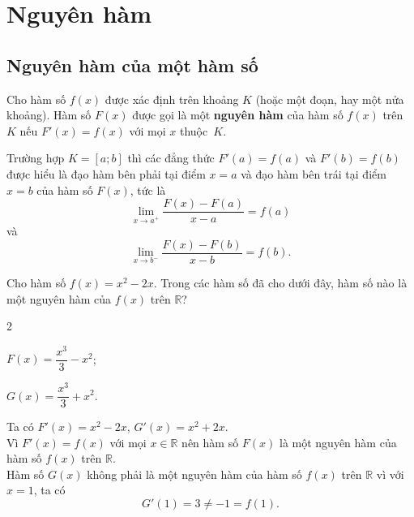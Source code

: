 \documentclass[12pt,aspectratio=169]{beamer}
\begin{document}

\section{Nguyên hàm}

\subsection{Nguyên hàm của một hàm số}

\begin{tomtat}
	\begin{dn}
		Cho hàm số $f(x)$ được xác định trên khoảng $K$ (hoặc một đoạn, hay một nửa khoảng). Hàm số $F(x)$ được gọi là một \textbf{nguyên hàm} của hàm số $f(x)$ trên $K$ nếu $F'(x) = f(x)$ với mọi $x$ thuộc~$K$.
	\end{dn}

	\begin{note}
		Trường hợp $K = [a;b]$ thì các đẳng thức $F'(a) = f(a)$ và $F'(b) = f(b)$ được hiểu là đạo hàm bên phải tại điểm $x = a$ và đạo hàm bên trái tại điểm $x = b$ của hàm số $F(x)$, tức là
		\[\lim\limits_{x\to a^{+}} \dfrac{F(x) - F(a)}{x - a} = f(a)\] và \[\lim\limits_{x\to b^{-}} \dfrac{F(x) - F(b)}{x - b} = f(b).\]
	\end{note}
\end{tomtat}

\begin{vd}
	Cho hàm số $f(x) = x^2 - 2x$. Trong các hàm số đã cho dưới đây, hàm số nào là một nguyên hàm của $f(x)$ trên $\mathbb{R}$?
	\begin{enumEX}{2}
		\item $F(x) = \dfrac{x^3}{3} - x^2$;
		\item $G(x) = \dfrac{x^3}{3} + x^2$.
	\end{enumEX}

	\begin{loigiai}
		Ta có $F'(x) = x^2 - 2x$, $G'(x) = x^2 + 2x$.\\
		Vì $F'(x) = f(x)$ với mọi $x \in \mathbb{R}$ nên hàm số $F(x)$ là một nguyên hàm của hàm số $f(x)$ trên $\mathbb{R}$.\\
		Hàm số $G(x)$ không phải là một nguyên hàm của hàm số $f(x)$ trên $\mathbb{R}$ vì với $x = 1$, ta có
		\[G'(1) = 3 \neq -1 = f(1).\]
	\end{loigiai}
\end{vd}
\end{document}
